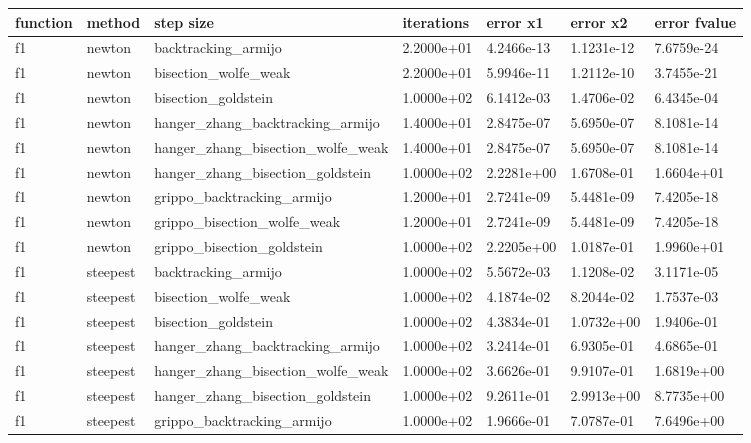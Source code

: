 \documentclass[a4paper,11pt]{article}
\numberwithin{equation}{section} %
\begin{document}
\begin{longtable}{p{1.5cm}|p{1.5cm}|p{4cm}|p{2cm}|p{2cm}|p{2cm}|p{2cm}}
        function & method & step size & iterations & error x1 & error x2 & error fvalue \\ \hline
        f1 & newton & backtracking\_armijo & 2.2000e+01 & 4.2466e-13 & 1.1231e-12 & 7.6759e-24 \\
        f1 & newton & bisection\_wolfe\_weak & 2.2000e+01 & 5.9946e-11 & 1.2112e-10 & 3.7455e-21 \\
        f1 & newton & bisection\_goldstein & 1.0000e+02 & 6.1412e-03 & 1.4706e-02 & 6.4345e-04 \\
        f1 & newton & hanger\_zhang\_backtracking\_armijo & 1.4000e+01 & 2.8475e-07 & 5.6950e-07 & 8.1081e-14 \\
        f1 & newton & hanger\_zhang\_bisection\_wolfe\_weak & 1.4000e+01 & 2.8475e-07 & 5.6950e-07 & 8.1081e-14 \\
        f1 & newton & hanger\_zhang\_bisection\_goldstein & 1.0000e+02 & 2.2281e+00 & 1.6708e-01 & 1.6604e+01 \\
        f1 & newton & grippo\_backtracking\_armijo & 1.2000e+01 & 2.7241e-09 & 5.4481e-09 & 7.4205e-18 \\
        f1 & newton & grippo\_bisection\_wolfe\_weak & 1.2000e+01 & 2.7241e-09 & 5.4481e-09 & 7.4205e-18 \\
        f1 & newton & grippo\_bisection\_goldstein & 1.0000e+02 & 2.2205e+00 & 1.0187e-01 & 1.9960e+01 \\
        f1 & steepest & backtracking\_armijo & 1.0000e+02 & 5.5672e-03 & 1.1208e-02 & 3.1171e-05 \\
        f1 & steepest & bisection\_wolfe\_weak & 1.0000e+02 & 4.1874e-02 & 8.2044e-02 & 1.7537e-03 \\
        f1 & steepest & bisection\_goldstein & 1.0000e+02 & 4.3834e-01 & 1.0732e+00 & 1.9406e-01 \\
        f1 & steepest & hanger\_zhang\_backtracking\_armijo & 1.0000e+02 & 3.2414e-01 & 6.9305e-01 & 4.6865e-01 \\
        f1 & steepest & hanger\_zhang\_bisection\_wolfe\_weak & 1.0000e+02 & 3.6626e-01 & 9.9107e-01 & 1.6819e+00 \\
        f1 & steepest & hanger\_zhang\_bisection\_goldstein & 1.0000e+02 & 9.2611e-01 & 2.9913e+00 & 8.7735e+00 \\
        f1 & steepest & grippo\_backtracking\_armijo & 1.0000e+02 & 1.9666e-01 & 7.0787e-01 & 7.6496e+00 \\

\end{longtable}
\end{document}
